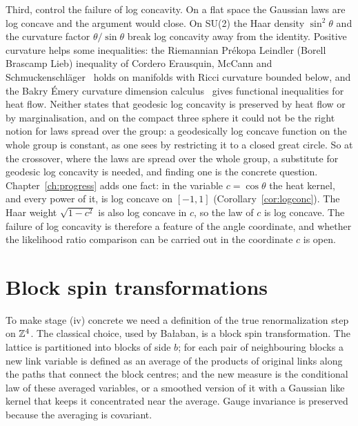 Third, control the failure of log concavity. On a flat space the Gaussian laws are log concave and the argument would close. On SU(2) the Haar density $\sin^2\theta$ and the curvature factor $\theta/\sin\theta$ break log concavity away from the identity. Positive curvature helps some inequalities: the Riemannian Pr\'ekopa Leindler (Borell Brascamp Lieb) inequality of Cordero Erausquin, McCann and Schmuckenschl\"ager~\cite{CMS} holds on manifolds with Ricci curvature bounded below, and the Bakry \'Emery curvature dimension calculus~\cite{BE} gives functional inequalities for heat flow. Neither states that geodesic log concavity is preserved by heat flow or by marginalisation, and on the compact three sphere it could not be the right notion for laws spread over the group: a geodesically log concave function on the whole group is constant, as one sees by restricting it to a closed great circle. So at the crossover, where the laws are spread over the whole group, a substitute for geodesic log concavity is needed, and finding one is the concrete question. Chapter~\ref{ch:progress} adds one fact: in the variable $c=\cos\theta$ the heat kernel, and every power of it, is log concave on $[-1,1]$ (Corollary~\ref{cor:logconc}). The Haar weight $\sqrt{1-c^2}$ is also log concave in $c$, so the law of $c$ is log concave. The failure of log concavity is therefore a feature of the angle coordinate, and whether the likelihood ratio comparison can be carried out in the coordinate $c$ is open.

\section{Block spin transformations}

To make stage (iv) concrete we need a definition of the true renormalization step on $\mathbb{Z}^4$. The classical choice, used by Ba\l aban, is a block spin transformation. The lattice is partitioned into blocks of side $b$; for each pair of neighbouring blocks a new link variable is defined as an average of the products of original links along the paths that connect the block centres; and the new measure is the conditional law of these averaged variables, or a smoothed version of it with a Gaussian like kernel that keeps it concentrated near the average. Gauge invariance is preserved because the averaging is covariant.

